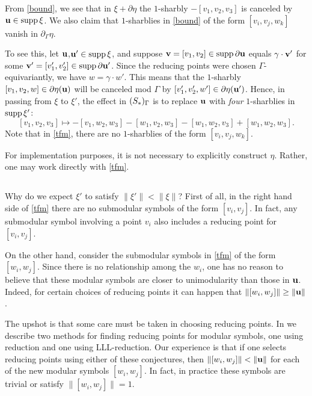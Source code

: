 From \eqref{bound}, we see that in $\xi +\partial \eta $ the
$1$-sharbly $-[v_{1},v_{2},v_{3}]$ is canceled by ${\mathbf {u}} \in \operatorname{supp}
\xi $.  We also claim that $1$-sharblies in \eqref{bound} of the form
$[v_{i},v_{j},w_{k}]$ vanish in 
$\partial_{\Gamma } \eta $.

To see this, let ${\mathbf {u}} $,${\mathbf {u}} '\in \operatorname{supp} \xi $, and suppose ${\mathbf {v}} =
[v_{1},v_{2}]\in \operatorname{supp} \partial {\mathbf {u}} $ equals $\gamma \cdot {\mathbf {v}} '$
for some ${\mathbf {v}} ' = [v_{1}',v_{2}']\in \operatorname{supp} \partial {\mathbf {u}} '$.  Since
the reducing points were chosen $\Gamma $-equivariantly, we have
$w=\gamma \cdot w'$.  This means that the $1$-sharbly $[v_{1},v_{2},
w]\in \partial \eta ({\mathbf {u}} )$ will be canceled mod $\Gamma $ by
$[v_{1}',v_{2}', w']\in \partial \eta ({\mathbf {u}}' )$.  Hence, in passing
from $\xi $ to $\xi '$, the effect in $(S_{*})_{\Gamma }$ is to replace ${\mathbf {u}} $
with \emph{four} $1$-sharblies in $\operatorname{supp} \xi '$:
\begin{equation}\label{tfm}
[v_{1},v_{2},v_{3}]\longmapsto - [v_{1},w_{2},w_{3}] -
[w_{1},v_{2},w_{3}] - [w_{1},w_{2},v_{3}] + [w_{1},w_{2},w_{3}].
\end{equation}
Note that in \eqref{tfm}, there are no $1$-sharblies of the form
$[v_{i},v_{j},w_{k}]$.

\begin{remark}\label{imp1}
For implementation purposes, it is not necessary to explicitly
construct $\eta $.  Rather, one may work directly with \eqref{tfm}.
\end{remark}

\subsection{}\label{interior.ms}
%
Why do we expect $\xi ' $ to satisfy $\|\xi '\| < \|\xi \|$?  First of
all, in the right hand side of \eqref{tfm} there are no submodular
symbols of the form $[v_{i},v_{j}]$.  In fact, any submodular symbol
involving a point $v_{i}$ also includes a reducing point for 
$[v_{i},v_{j}]$.

On the other hand, consider the submodular symbols in \eqref{tfm} of
the form $[w_{i},w_{j}]$.  Since there is no relationship among the
$w_{i}$, one has no reason to believe that these modular symbols are
closer to unimodularity than those in ${\mathbf {u}} $.  Indeed, for certain
choices of reducing points it can happen that $\|[w_{i},w_{j}]\|\geq
\|{\mathbf {u}} \|$.

The upshot is that some care must be taken in choosing reducing
points.  In \cite[Conjectures 3.5 and 3.6]{experimental} we describe
two methods for finding reducing points for modular symbols, one using
\Vor reduction and one using LLL-reduction.  Our experience is that
if one selects reducing points using either of these conjectures,
then $\|[w_{i},w_{j}]\|< \|{\mathbf {u}} \|$ for each of the new modular symbols
$[w_{i},w_{j}]$.  In fact, in practice these symbols are trivial or
satisfy $\|[w_{i},w_{j}]\|=1$.

